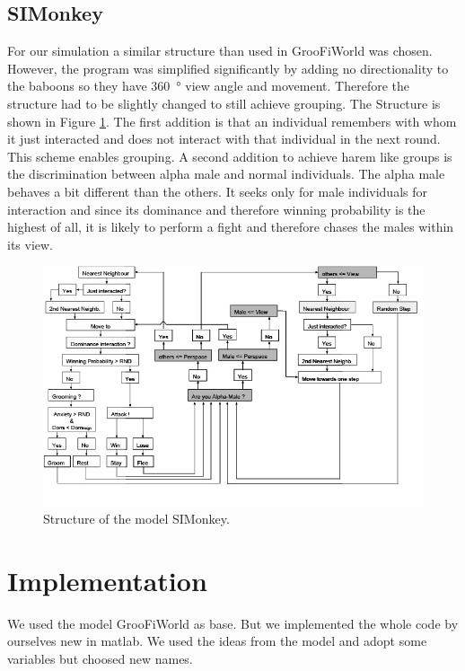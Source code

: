 \documentclass[11pt]{article}
\begin{document}
\subsection{SIMonkey}
\label{sec:SIMonkey}
For our simulation a similar structure than used in GrooFiWorld was chosen. However, the program was simplified significantly by adding no directionality to the baboons so they have \SI{360}{\degree} view angle and movement. Therefore the structure had to be slightly changed to still achieve grouping. The Structure is shown in Figure \ref{fig:SIMonkey_Flussdiagramm}. The first addition is that an individual remembers with whom it just interacted and does not interact with that individual in the next round. This scheme enables grouping. A second addition to achieve harem like groups is the discrimination between alpha male and normal individuals. The alpha male behaves a bit different than the others. It seeks only for male individuals for interaction and since its dominance and therefore winning probability is the highest of all, it is likely to perform a fight and therefore chases the males within its view.

\begin{figure}[H]
\centering
\includegraphics[scale=0.65]{Photos/Flussdiagramm}
\caption[Structure of the model SIMonkey]{Structure of the model SIMonkey.}
\label{fig:SIMonkey_Flussdiagramm}
\end{figure}

\section{Implementation}
We used the model GrooFiWorld as base. But we implemented the whole code by ourselves new in matlab. We used the ideas from the model and adopt some variables but choosed new names.\\
\end{document}
